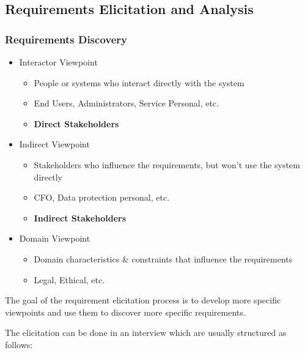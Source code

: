 \documentclass[
../../Software_Engineering_Summary.tex,
]
{subfiles}
\begin{document}
\subsection{Requirements Elicitation and Analysis}
\subsubsection{Requirements Discovery}
\begin{defbox}
    \begin{itemize}
        \item Interactor Viewpoint
        \begin{itemize}
            \item People or systems who interact directly with the system
            \item End Users, Administrators, Service Personal, etc.
            \item \textbf{Direct Stakeholders}
        \end{itemize}
        \item Indirect Viewpoint
        \begin{itemize}
            \item Stakeholders who influence the requirements, but won't use the system directly
            \item CFO, Data protection personal, etc.
            \item \textbf{Indirect Stakeholders}
        \end{itemize}
        \item Domain Viewpoint
        \begin{itemize}
            \item Domain characteristics \& constraints that influence the requirements
            \item Legal, Ethical, etc.
        \end{itemize}
    \end{itemize}
\end{defbox}

The goal of the requirement elicitation process is to develop more specific viewpoints and use them to discover more specific requirements.

The elicitation can be done in an interview which are usually structured as follows:
\end{document}
